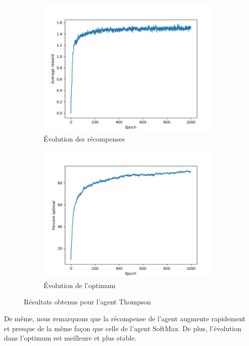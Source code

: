 \documentclass[a4paper,english,12pt]{article}
\begin{document}
\begin{figure}[H]
	\centering
	\begin{subfigure}{0.48\textwidth}
		\includegraphics[width=\textwidth]{ucb_reward}
		\caption{Évolution des récompenses}
	\end{subfigure}
	\begin{subfigure}{0.48\textwidth}
		\includegraphics[width=\textwidth]{ucb_optimal}
		\caption{Évolution de l'optimum}
	\end{subfigure}
	\caption{Résultats obtenus pour l'agent Thompson}
\end{figure}

De même, nous remarquons que la récompense de l'agent augmente rapidement et presque de la même façon que celle de l'agent SoftMax. De plus, l'évolution dans l'optimum est meilleure et plus stable.
\end{document}
